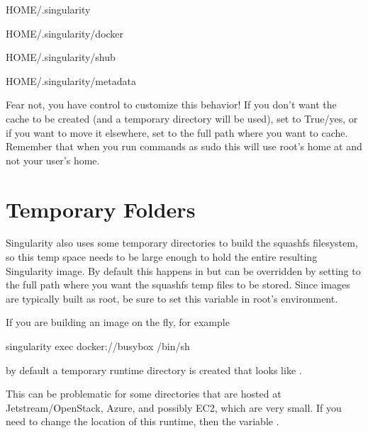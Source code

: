 \documentclass[letterpaper,10pt,english]{sphinxmanual}
\begin{document}
%
\begin{sphinxVerbatim}[commandchars=\\\{\}]
\PYGZdl{}HOME/.singularity

\PYGZdl{}HOME/.singularity/docker

\PYGZdl{}HOME/.singularity/shub

\PYGZdl{}HOME/.singularity/metadata
\end{sphinxVerbatim}

Fear not, you have control to customize this behavior! If you don’t want
the cache to be created (and a temporary directory will be used), set  to
True/yes, or if you want to move it elsewhere, set  to the full path
where you want to cache. Remember that when you run commands as sudo
this will use root’s home at  and not your user’s home.


\section{Temporary Folders}
\label{\detokenize{build_environment:temporary-folders}}\begin{quote}
\label{\detokenize{build_environment:sec-temporaryfolders}}\end{quote}

Singularity also uses some temporary directories to build the squashfs filesystem,
so this temp space needs to be large enough to hold the entire resulting Singularity image.
By default this happens in  but can be overridden by setting  to the full
path where you want the squashfs temp files to be stored. Since images
are typically built as root, be sure to set this variable in root’s
environment.

If you are building an image on the fly, for example

%
\begin{sphinxVerbatim}[commandchars=\\\{\}]
singularity exec docker://busybox /bin/sh
\end{sphinxVerbatim}

by default a temporary runtime directory is created that looks like .

This can be problematic for some  directories that are hosted at
Jetstream/OpenStack, Azure, and possibly EC2, which are very small. If
you need to change the location of this runtime, then  the
variable .
\end{document}
